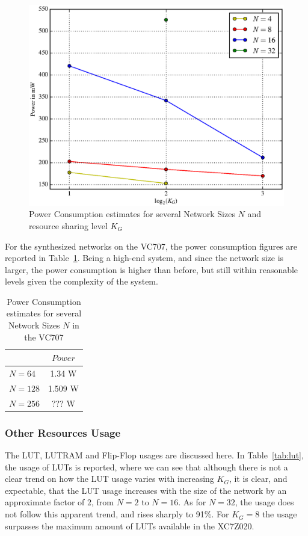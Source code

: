 \documentclass{IEEEtran}
\begin{document}
\begin{figure}
    \centering
    \includegraphics[width=\linewidth]{figures/power.eps}
    \caption{Power Consumption estimates for several Network Sizes $N$ and resource sharing level $K_G$}
    \label{fig:power}
\end{figure}

For the synthesized networks on the VC707, the power consumption figures are reported in Table~\ref{tab:power-virtx7}. Being a high-end
system, and since the network size is larger, the power consumption is higher than before, but still within reasonable levels given
the complexity of the system.

\begin{table}
	\caption{Power Consumption estimates for several Network Sizes $N$ in the VC707}
	\label{tab:power-virtx7}
    \centering
  \begin{tabular}{ | l | c | }
    \hline
     & $Power$  \\
    \hline
    $N=64$ & 1.34 W \\
    \hline
    $N=128$ & 1.509 W\\
    \hline
    $N=256$ & ??? W \\
\hline
  \end{tabular}

\end{table}

\subsubsection{Other Resources Usage}\label{sec:res-synth-otheres}
The LUT, LUTRAM and Flip-Flop usages are discussed here. In Table~\ref{tab:lut}, the usage of LUTs is reported, where we can see
that although there is not a clear trend on how the LUT usage varies with increasing $K_G$, it is clear, and expectable, that
the LUT usage increases with the size of the network by an approximate factor of 2, from $N=2$ to $N=16$. As for $N=32$, the
usage does not follow this apparent trend, and rises sharply to 91\%. For $K_G = 8$ the usage surpasses the maximum amount
of LUTs available in the XC7Z020.
\end{document}
